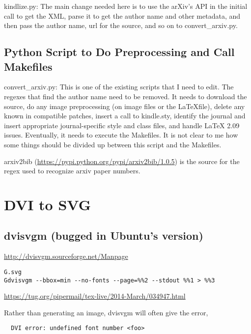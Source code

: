 \documentclass[12pt]{article}
\begin{document}
kindlize.py: The main change needed here is to use the arXiv's API
in the initial call to get the XML, parse it to get the author name
and other metadata, and then pass the author name, url for the source,
and so on to convert\_arxiv.py.


\subsection{Python Script to Do Preprocessing and Call Makefiles}
\label{sec:python_script}

convert\_arxiv.py: This is one of the existing scripts that I need to
edit.  The regexes that find the author name need to be removed.  It
needs to download the source, do any image preprocessing (on image
files or the \LaTeX file), delete any known in compatible patches,
insert a call to kindle.sty, identify the journal and insert
appropriate journal-specific style and class files, and handle \LaTeX
2.09 issues.  Eventually, it needs to execute the Makefiles.  It is
not clear to me how some things should be divided up between this
script and the Makefiles.

arxiv2bib (\url{https://pypi.python.org/pypi/arxiv2bib/1.0.5}) is the
source for the regex used to recognize arxiv paper numbers.



\section{DVI to SVG}
\label{sec:dvi2svg}


\subsection{dvisvgm (bugged in Ubuntu's version)}
\label{sec:dvisvgm}

\url{http://dvisvgm.sourceforge.net/Manpage}

\begin{lstlisting}
G.svg
Gdvisvgm --bbox=min --no-fonts --page=%%2 --stdout %%1 > %%3
\end{lstlisting}

\url{https://tug.org/pipermail/tex-live/2014-March/034947.html}

Rather than generating an image, dvisvgm will often give the error,

\begin{lstlisting}
  DVI error: undefined font number <foo>
\end{lstlisting}
\end{document}
